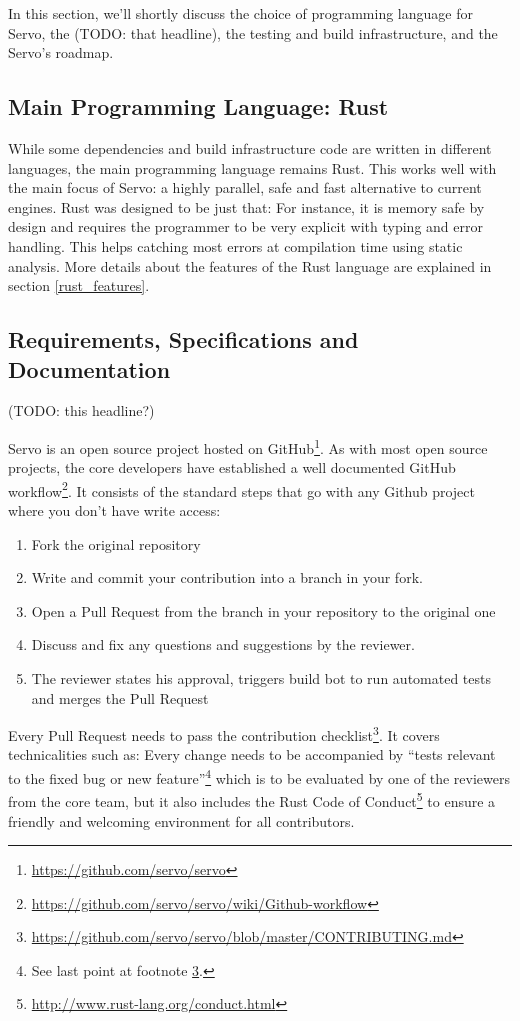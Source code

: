 \documentclass{scrartcl}
\newcommand{\todo}[1] {{\color{red}(TODO: #1)}}
\begin{document}
In this section, we'll shortly discuss the choice of programming language for Servo, the \todo{that headline}, the testing and build infrastructure, and the Servo's roadmap.


\subsection{Main Programming Language: Rust}

While some dependencies and build infrastructure code are written in different languages, the main programming language remains Rust. This works well with the main focus of Servo: a highly parallel, safe and fast alternative to current engines. Rust was designed to be just that: For instance, it is memory safe by design and requires the programmer to be very explicit with typing and error handling. This helps catching most errors at compilation time using static analysis. More details about the features of the Rust language are explained in section \ref{rust_features}.


\subsection{Requirements, Specifications and Documentation}
\todo{this headline?}

Servo is an open source project hosted on GitHub\footnote{\url{https://github.com/servo/servo}}. As with most open source projects, the core developers have established a well documented GitHub workflow\footnote{\url{https://github.com/servo/servo/wiki/Github-workflow}}. It consists of the standard steps that go with any Github project where you don't have write access:
\begin{enumerate}
    \item Fork the original repository
    \item Write and commit your contribution into a branch in your fork.
    \item Open a Pull Request from the branch in your repository to the original one
    \item Discuss and fix any questions and suggestions by the reviewer.
    \item The reviewer states his approval, triggers build bot to run automated tests and merges the Pull Request
\end{enumerate}

Every Pull Request needs to pass the contribution checklist\footnote{\label{contributing}\url{https://github.com/servo/servo/blob/master/CONTRIBUTING.md}}. It covers technicalities such as: Every change needs to be accompanied by ``tests relevant to the fixed bug or new feature''\footnote{See last point at footnote \ref{contributing}.} which is to be evaluated by one of the reviewers from the core team, but it also includes the Rust Code of Conduct\footnote{\url{http://www.rust-lang.org/conduct.html}} to ensure a friendly and welcoming environment for all contributors.  \\
\end{document}
